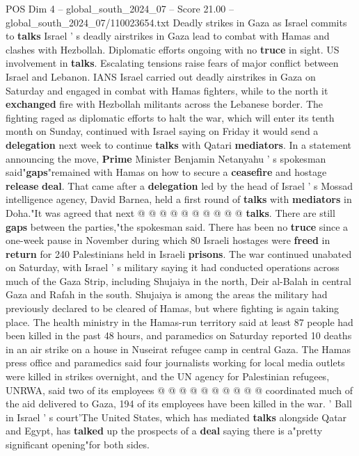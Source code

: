 \begin{textsample}{POS Dim 4 – global\_south\_2024\_07 – Score 21.00 – global\_south\_2024\_07/110023654.txt}  \label{ex:f4_pos_119}
Deadly strikes in Gaza as Israel commits to \textbf{talks} Israel ' s deadly airstrikes in Gaza lead to combat with Hamas and clashes with Hezbollah.
Diplomatic efforts ongoing with no \textbf{truce} in sight.
US involvement in \textbf{talks}.
Escalating tensions raise fears of major conflict between Israel and Lebanon.
IANS Israel carried out deadly airstrikes in Gaza on Saturday and engaged in combat with Hamas fighters, while to the north it \textbf{exchanged} fire with Hezbollah militants across the Lebanese border.
The fighting raged as diplomatic efforts to halt the war, which will enter its tenth month on Sunday, continued with Israel saying on Friday it would send a \textbf{delegation} next week to continue \textbf{talks} with Qatari \textbf{mediators}.
In a statement announcing the move, \textbf{Prime} Minister Benjamin Netanyahu ' s spokesman said"\textbf{gaps}"remained with Hamas on how to secure a \textbf{ceasefire} and hostage \textbf{release} \textbf{deal}.
That came after a \textbf{delegation} led by the head of Israel ' s Mossad intelligence agency, David Barnea, held a first round of \textbf{talks} with \textbf{mediators} in Doha."It was agreed that next @ @ @ @ @ @ @ @ @ @ \textbf{talks}.
There are still \textbf{gaps} between the parties,"the spokesman said.
There has been no \textbf{truce} since a one-week pause in November during which 80 Israeli hostages were \textbf{freed} in \textbf{return} for 240 Palestinians held in Israeli \textbf{prisons}.
The war continued unabated on Saturday, with Israel ' s military saying it had conducted operations across much of the Gaza Strip, including Shujaiya in the north, Deir al-Balah in central Gaza and Rafah in the south.
Shujaiya is among the areas the military had previously declared to be cleared of Hamas, but where fighting is again taking place.
The health ministry in the Hamas-run territory said at least 87 people had been killed in the past 48 hours, and paramedics on Saturday reported 10 deaths in an air strike on a house in Nuseirat refugee camp in central Gaza.
The Hamas press office and paramedics said four journalists working for local media outlets were killed in strikes overnight, and the UN agency for Palestinian refugees, UNRWA, said two of its employees @ @ @ @ @ @ @ @ @ @ coordinated much of the aid delivered to Gaza, 194 of its employees have been killed in the war. ' Ball in Israel ' s court'The United States, which has mediated \textbf{talks} alongside Qatar and Egypt, has \textbf{talked} up the prospects of a \textbf{deal} saying there is a"pretty significant opening"for both sides.

\end{textsample}

